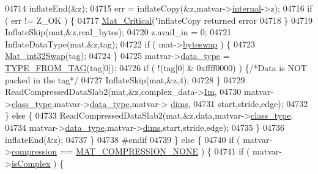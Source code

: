 \begin{DoxyCode}
{{{{{{{{{{{{{{{{{{{{{{{{{{04714                 inflateEnd(&z);
04715                 err = inflateCopy(&z,matvar->\hyperlink{group___m_a_t_a6e97e3ed9f40c49322c18561c2a94e92}{internal}->z);
04716                 \textcolor{keywordflow}{if} ( err != Z\_OK ) \{
04717                     \hyperlink{group__mat__util_gaf51f2bfbb5580f575e4dd79757e2b80c}{Mat\_Critical}(\textcolor{stringliteral}{"inflateCopy returned error %
04718                 \}
04719                 InflateSkip(mat,&z,real\_bytes);
04720                 z.avail\_in = 0;
04721                 InflateDataType(mat,&z,tag);
04722                 \textcolor{keywordflow}{if} ( mat->\hyperlink{struct__mat__t_a99d207977af5e04941ace56d71817a40}{byteswap} ) \{
04723                     \hyperlink{endian_8c_a2e0153996243f0a34df9a5286087cfa3}{Mat\_int32Swap}(tag);
04724                 \}
04725                 matvar->\hyperlink{group___m_a_t_ab6aafe9bd77f0f077852593dec438144}{data\_type} = \hyperlink{mat5_8c_a82bacecc4afc633b61bc3dc8ef88d1ed}{TYPE\_FROM\_TAG}(tag[0]);
04726                 \textcolor{keywordflow}{if} ( !(tag[0] & 0xffff0000) ) \{\textcolor{comment}{/*Data is NOT packed in the tag*/}
04727                     InflateSkip(mat,&z,4);
04728                 \}
04729                 ReadCompressedDataSlab2(mat,&z,complex\_data->\hyperlink{group___m_a_t_a7182d10b0d3598415887376065440946}{Im},
04730                     matvar->\hyperlink{group___m_a_t_aff13035bf3265dd7d9425e5d40c839d4}{class\_type},matvar->\hyperlink{group___m_a_t_ab6aafe9bd77f0f077852593dec438144}{data\_type},matvar->
      \hyperlink{group___m_a_t_a8e01234e1c862ce3472bb37f5a09b92c}{dims},
04731                     start,stride,edge);
04732             \} \textcolor{keywordflow}{else} \{
04733                 ReadCompressedDataSlab2(mat,&z,data,matvar->\hyperlink{group___m_a_t_aff13035bf3265dd7d9425e5d40c839d4}{class\_type},
04734                     matvar->\hyperlink{group___m_a_t_ab6aafe9bd77f0f077852593dec438144}{data\_type},matvar->\hyperlink{group___m_a_t_a8e01234e1c862ce3472bb37f5a09b92c}{dims},start,stride,edge);
04735             \}
04736             inflateEnd(&z);
04737         \}
04738 \textcolor{preprocessor}{#endif}
04739     \} \textcolor{keywordflow}{else} \{
04740         \textcolor{keywordflow}{if} ( matvar->\hyperlink{group___m_a_t_aeef0466048621cb2c959ba7f6c774d06}{compression} == \hyperlink{group___m_a_t_gga768c318af97bd2567758ecb001ceb7f4a2280b97631ff5dd24dec55261dc587b6}{MAT\_COMPRESSION\_NONE} ) \{
04741             \textcolor{keywordflow}{if} ( matvar->\hyperlink{group___m_a_t_aeb03b3a69f108dc05470b00443a43739}{isComplex} ) \{
}}}}}}}}}}}}}}}}}}}}}}}}}}}
\end{DoxyCode}
